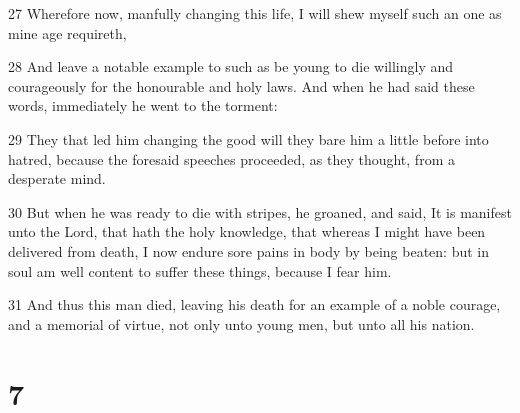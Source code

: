 \par 27 Wherefore now, manfully changing this life, I will shew myself such an one as mine age requireth,
\par 28 And leave a notable example to such as be young to die willingly and courageously for the honourable and holy laws. And when he had said these words, immediately he went to the torment:
\par 29 They that led him changing the good will they bare him a little before into hatred, because the foresaid speeches proceeded, as they thought, from a desperate mind.
\par 30 But when he was ready to die with stripes, he groaned, and said, It is manifest unto the Lord, that hath the holy knowledge, that whereas I might have been delivered from death, I now endure sore pains in body by being beaten: but in soul am well content to suffer these things, because I fear him.
\par 31 And thus this man died, leaving his death for an example of a noble courage, and a memorial of virtue, not only unto young men, but unto all his nation.

\chapter{7}

